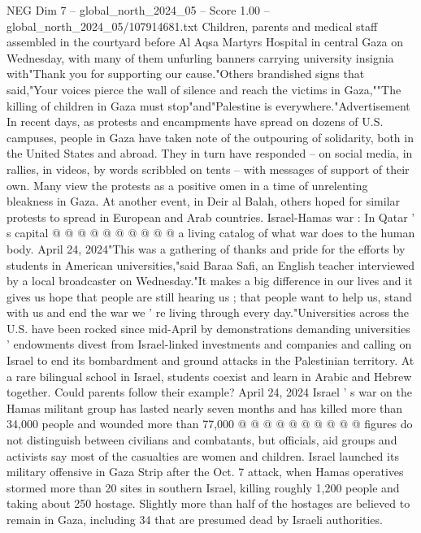 \begin{textsample}{NEG Dim 7 – global\_north\_2024\_05 – Score 1.00 – global\_north\_2024\_05/107914681.txt}  \label{ex:f7_neg_405}
Children, parents and medical staff assembled in the courtyard before Al Aqsa Martyrs Hospital in central Gaza on Wednesday, with many of them unfurling banners carrying university insignia with"Thank you for supporting our cause."Others brandished signs that said,"Your voices pierce the wall of silence and reach the victims in Gaza,""The killing of children in Gaza must stop"and"Palestine is everywhere."Advertisement In recent days, as protests and encampments have spread on dozens of U.S. campuses, people in Gaza have taken note of the outpouring of solidarity, both in the United States and abroad.
They in turn have responded -- on social media, in rallies, in videos, by words scribbled on tents -- with messages of support of their own.
Many view the protests as a positive omen in a time of unrelenting bleakness in Gaza.
At another event, in Deir al Balah, others hoped for similar protests to spread in European and Arab countries.
Israel-Hamas war : In Qatar ' s capital @ @ @ @ @ @ @ @ @ @ a living catalog of what war does to the human body.
April 24, 2024"This was a gathering of thanks and pride for the efforts by students in American universities,"said Baraa Safi, an English teacher interviewed by a local broadcaster on Wednesday."It makes a big difference in our lives and it gives us hope that people are still hearing us ; that people want to help us, stand with us and end the war we ' re living through every day."Universities across the U.S. have been rocked since mid-April by demonstrations demanding universities ' endowments divest from Israel-linked investments and companies and calling on Israel to end its bombardment and ground attacks in the Palestinian territory.
At a rare bilingual school in Israel, students coexist and learn in Arabic and Hebrew together.
Could parents follow their example?
April 24, 2024 Israel ' s war on the Hamas militant group has lasted nearly seven months and has killed more than 34,000 people and wounded more than 77,000 @ @ @ @ @ @ @ @ @ @ figures do not distinguish between civilians and combatants, but officials, aid groups and activists say most of the casualties are women and children.
Israel launched its military offensive in Gaza Strip after the Oct. 7 attack, when Hamas operatives stormed more than 20 sites in southern Israel, killing roughly 1,200 people and taking about 250 hostage.
Slightly more than half of the hostages are believed to remain in Gaza, including 34 that are presumed dead by Israeli authorities.

\end{textsample}
